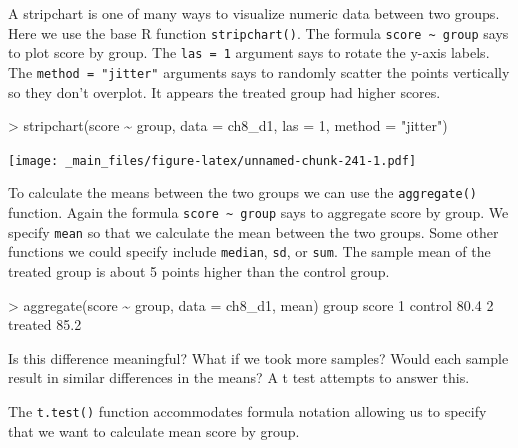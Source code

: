 \documentclass[
]{book}
\newenvironment{Shaded}{\begin{snugshade}}{\end{snugshade}}
\newcommand{\AttributeTok}[1]{\textcolor[rgb]{0.77,0.63,0.00}{#1}}
\newcommand{\DecValTok}[1]{\textcolor[rgb]{0.00,0.00,0.81}{#1}}
\newcommand{\FloatTok}[1]{\textcolor[rgb]{0.00,0.00,0.81}{#1}}
\newcommand{\FunctionTok}[1]{\textcolor[rgb]{0.00,0.00,0.00}{#1}}
\newcommand{\NormalTok}[1]{#1}
\newcommand{\SpecialCharTok}[1]{\textcolor[rgb]{0.00,0.00,0.00}{#1}}
\newcommand{\StringTok}[1]{\textcolor[rgb]{0.31,0.60,0.02}{#1}}
\begin{document}
A stripchart is one of many ways to visualize numeric data between two groups. Here we use the base R function \texttt{stripchart()}. The formula \texttt{score\ \textasciitilde{}\ group} says to plot score by group. The \texttt{las\ =\ 1} argument says to rotate the y-axis labels. The \texttt{method\ =\ "jitter"} arguments says to randomly scatter the points vertically so they don't overplot. It appears the treated group had higher scores.

\begin{Shaded}
\begin{Highlighting}[]
\SpecialCharTok{\textgreater{}} \FunctionTok{stripchart}\NormalTok{(score }\SpecialCharTok{\textasciitilde{}}\NormalTok{ group, }\AttributeTok{data =}\NormalTok{ ch8\_d1, }\AttributeTok{las =} \DecValTok{1}\NormalTok{, }\AttributeTok{method =} \StringTok{"jitter"}\NormalTok{)}
\end{Highlighting}
\end{Shaded}

\texttt{[image: \_main\_files/figure-latex/unnamed-chunk-241-1.pdf]}

To calculate the means between the two groups we can use the \texttt{aggregate()} function. Again the formula \texttt{score\ \textasciitilde{}\ group} says to aggregate score by group. We specify \texttt{mean} so that we calculate the mean between the two groups. Some other functions we could specify include \texttt{median}, \texttt{sd}, or \texttt{sum}. The sample mean of the treated group is about 5 points higher than the control group.

\begin{Shaded}
\begin{Highlighting}[]
\SpecialCharTok{\textgreater{}} \FunctionTok{aggregate}\NormalTok{(score }\SpecialCharTok{\textasciitilde{}}\NormalTok{ group, }\AttributeTok{data =}\NormalTok{ ch8\_d1, mean)}
\NormalTok{    group score}
\DecValTok{1}\NormalTok{ control  }\FloatTok{80.4}
\DecValTok{2}\NormalTok{ treated  }\FloatTok{85.2}
\end{Highlighting}
\end{Shaded}

Is this difference meaningful? What if we took more samples? Would each sample result in similar differences in the means? A t test attempts to answer this.

The \texttt{t.test()} function accommodates formula notation allowing us to specify that we want to calculate mean score by group.
\end{document}
